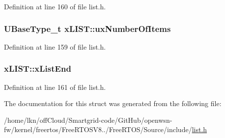 Definition at line 160 of file list.\+h.

\subsubsection[{\texorpdfstring{ux\+Number\+Of\+Items}{uxNumberOfItems}}]{ {\bf U\+Base\+Type\+\_\+t} x\+L\+I\+S\+T\+::ux\+Number\+Of\+Items}\hypertarget{structx_l_i_s_t_a84575245383c081395f3f49fe0356e33}{}\label{structx_l_i_s_t_a84575245383c081395f3f49fe0356e33}


Definition at line 159 of file list.\+h.

\subsubsection[{\texorpdfstring{x\+List\+End}{xListEnd}}]{ x\+L\+I\+S\+T\+::x\+List\+End}\hypertarget{structx_l_i_s_t_a49ad62fa153126e27e273811167b336a}{}\label{structx_l_i_s_t_a49ad62fa153126e27e273811167b336a}


Definition at line 161 of file list.\+h.



The documentation for this struct was generated from the following file\+:\begin{DoxyCompactItemize}
\item 
/home/lkn/off\+Cloud/\+Smartgrid-\/code/\+Git\+Hub/openwsn-\/fw/kernel/freertos/\+Free\+R\+T\+O\+S\+V8../\+Free\+R\+T\+O\+S/\+Source/include/\hyperlink{list_8h}{list.\+h}\end{DoxyCompactItemize}
